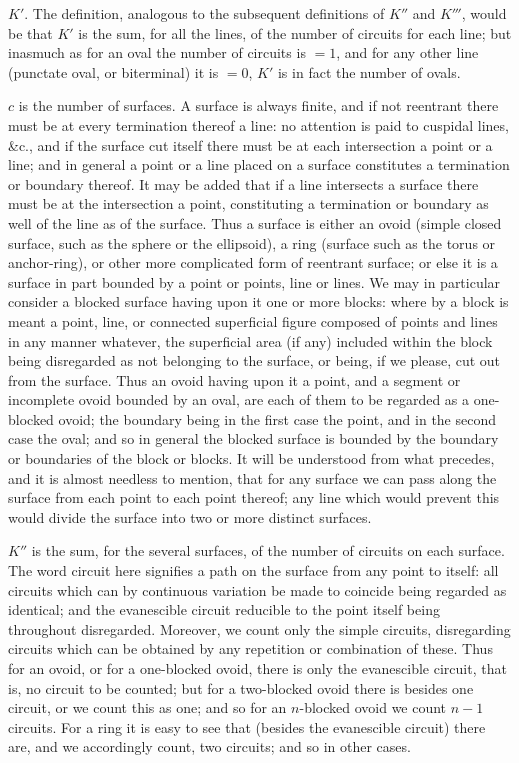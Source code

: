 \documentclass[11pt,a4paper]{article}
\begin{document}
$K'$.
The definition, analogous to the subsequent definitions of $K''$ and $K'''$, would be that $K'$ is the sum, for all the lines, of the number of circuits for each line; but inasmuch as for an oval the number of circuits is $=1$, and for any other line (punctate oval, or biterminal) it is $=0$, $K'$ is in fact the number of ovals.

$c$ is the number of surfaces.
A surface is always finite, and if not reentrant there must be at every termination thereof a line: no attention is paid to cuspidal lines, \&c., and if the surface cut itself there must be at each intersection a point or a line; and in general a point or a line placed on a surface constitutes a termination or boundary thereof.
It may be added that if a line intersects a surface there must be at the intersection a point, constituting a termination or boundary as well of the line as of the surface.
Thus a surface is either an ovoid (simple closed surface, such as the sphere or the ellipsoid), a ring (surface such as the torus or anchor-ring), or other more complicated form of reentrant surface; or else it is a surface in part bounded by a point or points, line or lines.
We may in particular consider a blocked surface having upon it one or more blocks: where by a block is meant a point, line, or connected superficial figure composed of points and lines in any manner whatever, the superficial area (if any) included within the block being disregarded as not belonging to the surface, or being, if we please, cut out from the surface.
Thus an ovoid having upon it a point, and a segment or incomplete ovoid bounded by an oval, are each of them to be regarded as a one-blocked ovoid; the boundary being in the first case the point, and in the second case the oval; and so in general the blocked surface is bounded by the boundary or boundaries of the block or blocks.
It will be understood from what precedes, and it is almost needless to mention, that for any surface we can pass along the surface from each point to each point thereof; any line which would prevent this would divide the surface into two or more distinct surfaces.

$K''$ is the sum, for the several surfaces, of the number of circuits on each surface.
The word circuit here signifies a path on the surface from any point to itself: all circuits which can by continuous variation be made to coincide being regarded as identical; and the evanescible circuit reducible to the point itself being throughout disregarded.
Moreover, we count only the simple circuits, disregarding circuits which can be obtained by any repetition or combination of these.
Thus for an ovoid, or for a one-blocked ovoid, there is only the evanescible circuit, that is, no circuit to be counted; but for a two-blocked ovoid there is besides one circuit, or we count this as one; and so for an $n$-blocked ovoid we count $n-1$ circuits.
For a ring it is easy to see that (besides the evanescible circuit) there are, and we accordingly count, two circuits; and so in other cases.
\end{document}
